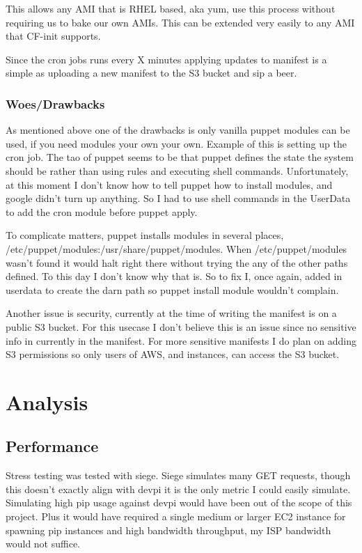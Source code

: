 \documentclass[12pt, letterpaper]{article}
\begin{document}
This allows any AMI that is RHEL based, aka yum, use this process without requiring us to bake our own AMIs. This can
be extended very easily to any AMI that CF-init supports.

Since the cron jobs runs every X minutes applying updates to manifest is a simple as uploading a new manifest to the S3 bucket
and sip a beer.


\subsubsection{Woes/Drawbacks}
As mentioned above one of the drawbacks is only vanilla puppet modules can be used, if you need modules your own your own.
Example of this is setting up the cron job. The tao of puppet seems to be that puppet defines the state the system should
be rather than using rules and executing shell commands. Unfortunately, at this moment I don't know how to tell puppet how
to install modules, and google didn't turn up anything. So I had to use shell commands in the UserData to add the cron module
before puppet apply.

To complicate matters, puppet installs modules in several places, /etc/puppet/modules:/usr/share/puppet/modules. When 
/etc/puppet/modules wasn't found it would halt right there without trying the any of the other paths defined. To this day I
don't know why that is. So to fix I, once again, added in userdata to create the darn path so puppet install module wouldn't
complain.

Another issue is security, currently at the time of writing the manifest is on a public S3 bucket. For this usecase I don't
believe this is an issue since no sensitive info in currently in the manifest. For more sensitive manifests I do plan on adding
S3 permissions so only users of AWS, and instances, can access the S3 bucket.

\section{Analysis}
\subsection{Performance}
Stress testing was tested with siege. Siege simulates many GET requests, though this doesn't exactly align with devpi it is the only 
metric I could easily simulate. Simulating high pip usage against devpi would have been out of the scope of this project. Plus it
would have required a single medium or larger EC2 instance for spawning pip instances and high bandwidth throughput, my ISP bandwidth
would not suffice.
\end{document}
